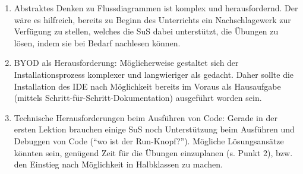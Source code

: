 \begin{myExBox}
\begin{myExBox}[title=Mögliche Schwierigkeiten \& geeignete Massnahmen]
\begin{enumerate}
    \item Abstraktes Denken zu Flussdiagrammen ist komplex und herausfordernd. Der wäre es hilfreich, bereits zu Beginn des Unterrichts ein Nachschlagewerk zur Verfügung zu stellen, welches die SuS dabei unterstützt, die Übungen zu lösen, indem sie bei Bedarf nachlesen können.
    \item BYOD als Herausforderung: Möglicherweise gestaltet sich der Installationsprozess komplexer und langwieriger als gedacht. Daher sollte die Installation des IDE nach Möglichkeit bereits im Voraus als Hausaufgabe (mittels Schritt-für-Schritt-Dokumentation) ausgeführt worden sein.
    \item Technische Herausforderungen beim Ausführen von Code: Gerade in der ersten Lektion brauchen einige SuS noch Unterstützung beim Ausführen und Debuggen von Code (``wo ist der Run-Knopf?''). Mögliche Lösungsansätze könnten sein, genügend Zeit für die Übungen einzuplanen (s. Punkt 2), bzw. den Einstieg nach Möglichkeit in Halbklassen zu machen. 
\end{enumerate}
\end{myExBox}
\end{myExBox}
\newpage

